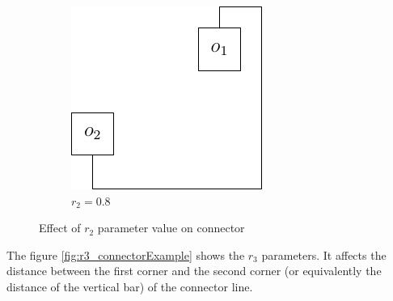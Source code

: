 \documentclass[a4paper,12pt]{report}
\begin{document}
\begin{figure}
\begin{subfigure}{.33\textwidth}
  \end{subfigure}\hfill
  \begin{subfigure}{.33\textwidth}
    \centering
    \includegraphics[width=0.9\linewidth]{connectorExample_r2_0_8.pdf}
    \caption{$r_2=0.8$}
  \end{subfigure}

  \caption{Effect of $r_2$ parameter value on connector}
  \label{fig:r2_connectorExample}
\end{figure}

The figure \ref{fig:r3_connectorExample} shows the $r_3$ parameters. It affects the distance between the first corner and the second corner (or equivalently the distance of the vertical bar) of the connector line.
\end{document}
